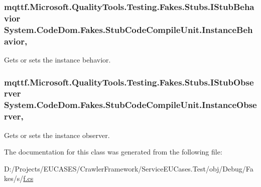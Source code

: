 \hypertarget{class_system_1_1_code_dom_1_1_fakes_1_1_stub_code_compile_unit_a5abb5cebb4a01646cf8be4dbe6ad95b6}{
\subsubsection[{Instance\-Behavior}]{\setlength{\rightskip}{0pt plus 5cm}mqttf.\-Microsoft.\-Quality\-Tools.\-Testing.\-Fakes.\-Stubs.\-I\-Stub\-Behavior System.\-Code\-Dom.\-Fakes.\-Stub\-Code\-Compile\-Unit.\-Instance\-Behavior\hspace{0.3cm}{\ttfamily [get]}, {\ttfamily [set]}}}\label{class_system_1_1_code_dom_1_1_fakes_1_1_stub_code_compile_unit_a5abb5cebb4a01646cf8be4dbe6ad95b6}


Gets or sets the instance behavior.

\hypertarget{class_system_1_1_code_dom_1_1_fakes_1_1_stub_code_compile_unit_a13832be6eb24f72f4bb5a28e98a9047a}{
\subsubsection[{Instance\-Observer}]{\setlength{\rightskip}{0pt plus 5cm}mqttf.\-Microsoft.\-Quality\-Tools.\-Testing.\-Fakes.\-Stubs.\-I\-Stub\-Observer System.\-Code\-Dom.\-Fakes.\-Stub\-Code\-Compile\-Unit.\-Instance\-Observer\hspace{0.3cm}{\ttfamily [get]}, {\ttfamily [set]}}}\label{class_system_1_1_code_dom_1_1_fakes_1_1_stub_code_compile_unit_a13832be6eb24f72f4bb5a28e98a9047a}


Gets or sets the instance observer.



The documentation for this class was generated from the following file\-:\begin{DoxyCompactItemize}
\item 
D\-:/\-Projects/\-E\-U\-C\-A\-S\-E\-S/\-Crawler\-Framework/\-Service\-E\-U\-Cases.\-Test/obj/\-Debug/\-Fakes/s/\hyperlink{s_2f_8cs}{f.\-cs}\end{DoxyCompactItemize}
